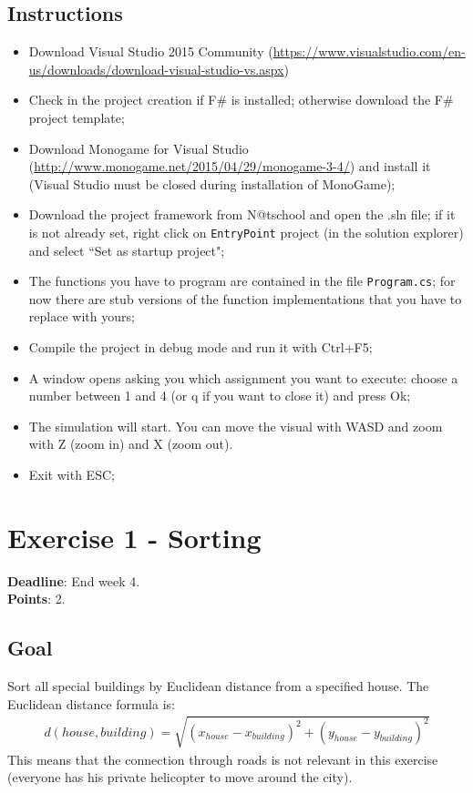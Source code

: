\documentclass[10pt,a4paper]{article}
\begin{document}
\subsection*{Instructions}
\begin{itemize}
\item Download Visual Studio 2015 Community (\url{https://www.visualstudio.com/en-us/downloads/download-visual-studio-vs.aspx}) 
\item Check in the project creation if F\# is installed; otherwise download the F\# project template;
\item Download Monogame for Visual Studio (\url{http://www.monogame.net/2015/04/29/monogame-3-4/}) and install it (Visual Studio must be closed during installation of MonoGame);
\item Download the project framework from N@tschool and open the .sln file; if it is not already set, right click on \texttt{EntryPoint} project (in the solution explorer) and select ``Set as startup project";
\item The functions you have to program are contained in the file \texttt{Program.cs}; for now there are stub versions of the function implementations that you have to replace with yours;
\item Compile the project in debug mode and run it with Ctrl+F5;
\item A window opens asking you which assignment you want to execute: choose a number between 1 and 4 (or q if you want to close it) and press Ok;
\item The simulation will start. You can move the visual with WASD and zoom with Z (zoom in) and X (zoom out).
\item Exit with ESC; 
\end{itemize}

\section*{Exercise 1 - Sorting}

\textbf{Deadline}: End week 4. \\
\textbf{Points}: 2.

\subsection*{Goal}
Sort all special buildings by Euclidean distance from a specified house. The Euclidean distance formula is:
\begin{align*}
d(house,building) = \sqrt{(x_{house} - x_{building})^{2} + (y_{house} - y_{building})^{2} } 
\end{align*}
This means that the connection through roads is not relevant in this exercise (everyone has his private helicopter to move around the city).
\end{document}
